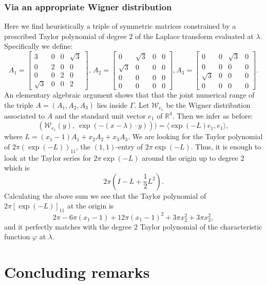 \documentclass[11pt,reqno]{amsart}
\theoremstyle{plain}
\theoremstyle{definition}
\numberwithin{equation}{section}
\begin{document}
\subsubsection{Via an appropriate Wigner distribution}\label{Subsub:Lorentz}
Here we find heuristically a triple of  symmetric matrices constrained by a prescribed  Taylor polynomial of degree $2$ of the Laplace transform evaluated at $\lambda$.
Specifically we define:
$$
A_1= \left[\begin{matrix}
    3 & 0 & 0 & \sqrt{3} \\ 0 & 2 & 0 & 0\\ 0 & 0 & 2 & 0 \\ \sqrt{3} & 0 & 0 & 2
\end{matrix} \right], \, 
A_2=\left[\begin{matrix}
    0 & \sqrt{3} & 0 & 0 \\ \sqrt{3} & 0 & 0 & 0\\ 0 & 0 & 0 & 0 \\ 0 & 0 & 0 & 0
\end{matrix} \right], 
A_3=\left[\begin{matrix}
   0 & 0 & \sqrt{3} & 0 \\ 0 & 0 & 0 & 0\\ \sqrt{3} & 0 & 0 & 0 \\ 0 & 0 & 0 & 0
\end{matrix} \right].
$$
An elementary algebraic argument shows that that the joint numerical range of the triple $A=(A_1, A_2, A_3)$ lies inside $\Gamma$. Let $\mathcal{W}_{e_1}$ be the Wigner distribution associated to $A$ and the standard unit vector $e_1$ of $\mathbb{R}^4$. Then we infer as before:
$$
(\mathcal{W}_{e_1}(y), \  \exp(- (x-\lambda)\cdot y)) ) = \langle \exp(-L) e_1, e_1 \rangle,
$$
where $L = (x_1 -1)A_1 + x_2 A_2 + x_3 A_3.$
We are looking for the Taylor polynomial of $2\pi (\exp(-L))_{11}$, the $(1, 1)$-entry of $2\pi \exp(-L)$. Thus, it is enough to look at the Taylor series for $2\pi \exp(-L)$ around the origin up to degree $2$ which is 
$$2\pi (I - L + \frac{1}{2}L^2).$$
Calculating the above sum we see that the Taylor polynomial of $2\pi [\exp(-L)]_{11}$ at the origin is 
$$2\pi - 6\pi(x_1-1) + 12\pi (x_1-1)^2 +3\pi x_2^2 + 3\pi x_3^2,$$
and it perfectly matches with the degree $2$ Taylor polynomial of the characteristic function $\varphi$ at $\lambda$.



\section{Concluding remarks}
\end{document}

